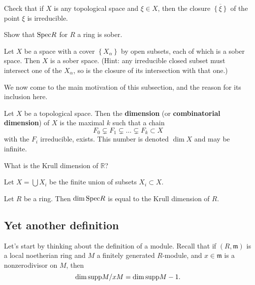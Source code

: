 \begin{exercise} 
Check that if $X$ is any topological space and $\xi  \in X$, then the closure
$\overline{\left\{\xi\right\}}$ of the point $\xi$ is irreducible.
\end{exercise} 

\begin{exercise} 
Show that $\mathrm{Spec} R$ for $R$ a ring is sober.
\end{exercise} 

\begin{exercise} 
Let $X$ be a space with a cover $\left\{X_\alpha\right\}$ by open subsets,
each of which is a sober space. Then $X$ is a sober space. (Hint: any
irreducible closed subset must intersect one of the $X_\alpha$, so is the
closure of its intersection with that one.)
\end{exercise} 

We now come to the main motivation of this subsection, and the reason for its
inclusion here.

\begin{definition} 
Let $X$ be a topological space. Then the \textbf{dimension} (or
\textbf{combinatorial dimension}) of $X$ is the maximal $k$ such that a chain
\[ F_0 \subsetneq F_1 \subsetneq \dots \subsetneq F_k \subset X  \]
with the $F_i$ irreducible, exists. This number is denoted $\dim X$ and may be
infinite.
\end{definition} 

\begin{exercise} 
What is the Krull dimension of $\mathbb{R}$?
\end{exercise} 

\begin{exercise} 
Let $X = \bigcup X_i$ be the finite union of subsets $X_i \subset X$. 

\end{exercise} 

\begin{exercise} 
Let $R$ be a ring. Then $\dim \mathrm{Spec} R$ is equal to the Krull dimension of $R$. 
\end{exercise} 




\subsection{Yet another definition}
Let's start by thinking about the definition of a module. Recall that if $(R,
\mathfrak{m})$ is
a local noetherian ring and $M$ a finitely generated $R$-module, and $x \in \mathfrak{m}$ is
a nonzerodivisor on $M$, then
\[ \dim \mathrm{supp} M/xM = \dim \mathrm{supp} M -1.  \]


